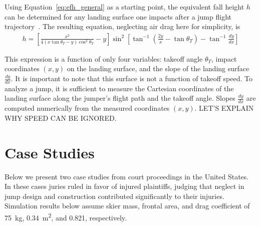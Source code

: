 \documentclass{article}
\begin{document}
Using Equation~\ref{eq:efh_general} as a starting point, the equivalent fall
height $h$ can be determined for any landing surface one impacts after a jump
flight trajectory~\cite{Hubbard2012}. The resulting equation, neglecting air
drag here for simplicity, is
%
\begin{align}
  h = \left[\frac{x^2}{4(x\tan\theta_T - y)\cos^{2}\theta_T} -
    y\right]\sin^{2}\left[\tan^{-1}\left(\frac{2y}{x}- \tan\theta_T\right) - \tan^{-1}\frac{dy}{dx}\right]
  \label{eq:efh}
\end{align}

This expression is  a function of only four variables: takeoff angle
$\theta_T$, impact coordinates $(x,y)$ on the landing surface, and the slope of
the landing surface $\frac{dy}{dx}$. It is important to note that this surface
is not a function of takeoff speed. To analyze a jump, it is sufficient to
measure the Cartesian coordinates of the landing surface along the jumper's
flight path and the takeoff angle. Slopes $\frac{dy}{dx}$ are computed
numerically from the measured coordinates $(x,y)$.  LET'S EXPLAIN WHY SPEED CAN
BE IGNORED.

\section{Case Studies}
%
Below we present two case studies from court proceedings in the United States.
In these cases juries ruled in favor of injured plaintiffs, judging that
neglect in jump design and construction contributed significantly to their
injuries. Simulation results below assume skier mass, frontal area, and drag
coefficient of 75~\si{\kg}, 0.34~\si{\meter\squared}, and 0.821, respectively.
\end{document}
